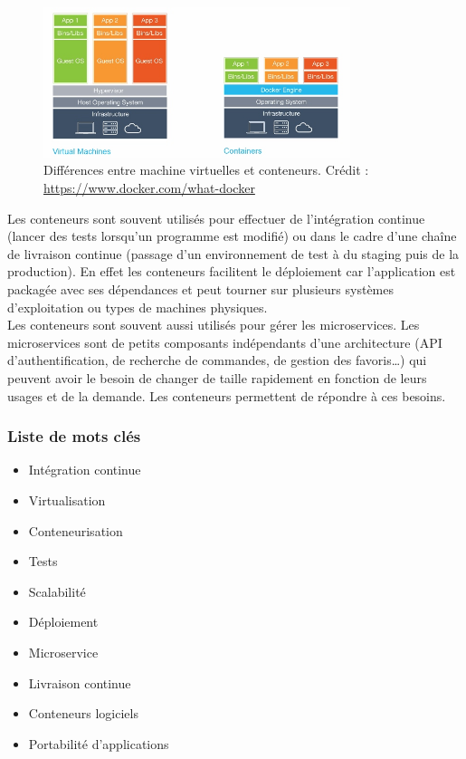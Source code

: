     \begin{figure}[h]
      \centering
      \includegraphics[width=0.8\textwidth]{images/vms-containers.jpg}
      \caption{Différences entre machine virtuelles et conteneurs. Crédit : \url{https://www.docker.com/what-docker}}
      \label{fig:vms-containers}
    \end{figure}

    Les conteneurs sont souvent utilisés pour effectuer de l'intégration continue (lancer des tests lorsqu'un programme est modifié) ou dans le cadre d'une chaîne de livraison continue (passage d'un environnement de test à du staging puis de la production). En effet les conteneurs facilitent le déploiement car l'application est packagée avec ses dépendances et peut tourner sur plusieurs systèmes d'exploitation ou types de machines physiques.\\

    Les conteneurs sont souvent aussi utilisés pour gérer les microservices. Les microservices sont de petits composants indépendants d'une architecture (API d'authentification, de recherche de commandes, de gestion des favoris\dots) qui peuvent avoir le besoin de changer de taille rapidement en fonction de leurs usages et de la demande. Les conteneurs permettent de répondre à ces besoins.

    \subsubsection*{Liste de mots clés}
        \begin{itemize}
            \item Intégration continue
            \item Virtualisation
            \item Conteneurisation
            \item Tests
            \item Scalabilité
            \item Déploiement
            \item Microservice
            \item Livraison continue
            \item Conteneurs logiciels
            \item Portabilité d'applications
        \end{itemize}


